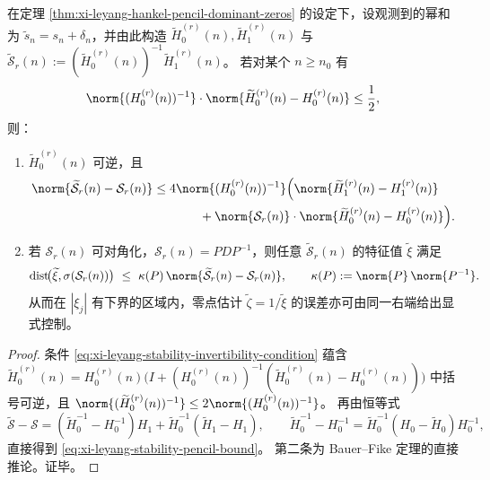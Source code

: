 \begin{theorem}[累积量噪声扰动下的零点重构稳定性]\label{thm:xi-leyang-reconstruction-stability-under-noise}
在定理 \ref{thm:xi-leyang-hankel-pencil-dominant-zeros} 的设定下，设观测到的幂和为 \(\widetilde s_n=s_n+\delta_n\)，并由此构造 \(\widetilde H_0^{(r)}(n),\widetilde H_1^{(r)}(n)\) 与
\(
\widetilde{\mathcal S}_r(n):=(\widetilde H_0^{(r)}(n))^{-1}\widetilde H_1^{(r)}(n)
\)。
若对某个 \(n\ge n_0\) 有
\begin{equation}\label{eq:xi-leyang-stability-invertibility-condition}
\norm{(H_0^{(r)}(n))^{-1}}\cdot \norm{\widetilde H_0^{(r)}(n)-H_0^{(r)}(n)}\le \frac12,
\end{equation}
则：
\begin{enumerate}
\item \(\widetilde H_0^{(r)}(n)\) 可逆，且
\begin{align}\label{eq:xi-leyang-stability-pencil-bound}
\norm{\widetilde{\mathcal S}_r(n)-\mathcal S_r(n)}
&\le
4\norm{(H_0^{(r)}(n))^{-1}}
\Bigl(\norm{\widetilde H_1^{(r)}(n)-H_1^{(r)}(n)}
\nonumber\\
&\hspace{3.7em}
+\norm{\mathcal S_r(n)}\cdot\norm{\widetilde H_0^{(r)}(n)-H_0^{(r)}(n)}\Bigr).
\end{align}
\item 若 \(\mathcal S_r(n)\) 可对角化，\(\mathcal S_r(n)=PDP^{-1}\)，则任意 \(\widetilde{\mathcal S}_r(n)\) 的特征值 \(\widetilde\xi\) 满足
\[
\mathrm{dist}\!\bigl(\widetilde\xi,\sigma(\mathcal S_r(n))\bigr)\ \le\ \kappa(P)\,\norm{\widetilde{\mathcal S}_r(n)-\mathcal S_r(n)},
\qquad
\kappa(P):=\norm{P}\,\norm{P^{-1}}.
\]
从而在 \(|\xi_j|\) 有下界的区域内，零点估计 \(\widetilde\zeta=1/\widetilde\xi\) 的误差亦可由同一右端给出显式控制。
\end{enumerate}
\end{theorem}
\begin{proof}
条件 \eqref{eq:xi-leyang-stability-invertibility-condition} 蕴含
\(
\widetilde H_0^{(r)}(n)=H_0^{(r)}(n)\bigl(I+(H_0^{(r)}(n))^{-1}(\widetilde H_0^{(r)}(n)-H_0^{(r)}(n))\bigr)
\)
中括号可逆，且
\(
\norm{(\widetilde H_0^{(r)}(n))^{-1}}\le 2\norm{(H_0^{(r)}(n))^{-1}}
\)。
再由恒等式
\[
\widetilde{\mathcal S}-\mathcal S
=(\widetilde H_0^{-1}-H_0^{-1})H_1+\widetilde H_0^{-1}(\widetilde H_1-H_1),
\qquad
\widetilde H_0^{-1}-H_0^{-1}=\widetilde H_0^{-1}(H_0-\widetilde H_0)H_0^{-1},
\]
直接得到 \eqref{eq:xi-leyang-stability-pencil-bound}。
第二条为 Bauer--Fike 定理的直接推论。证毕。
\end{proof}

\endinput

